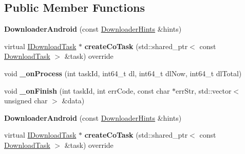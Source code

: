 \subsection*{Public Member Functions}
\begin{DoxyCompactItemize}
\item 
\mbox{\label{classcocos2d_1_1network_1_1DownloaderAndroid_a41411fbb138a35e9967efb3a33dd2e51}} 
{\bfseries Downloader\+Android} (const \hyperlink{classcocos2d_1_1network_1_1DownloaderHints}{Downloader\+Hints} \&hints)
\item 
\mbox{\label{classcocos2d_1_1network_1_1DownloaderAndroid_ac3d969626463383e2816530026a666ae}} 
virtual \hyperlink{classcocos2d_1_1network_1_1IDownloadTask}{I\+Download\+Task} $\ast$ {\bfseries create\+Co\+Task} (std\+::shared\+\_\+ptr$<$ const \hyperlink{classcocos2d_1_1network_1_1DownloadTask}{Download\+Task} $>$ \&task) override
\item 
\mbox{\label{classcocos2d_1_1network_1_1DownloaderAndroid_af201a8862f25a387915ebcfb6e9c19af}} 
void {\bfseries \+\_\+on\+Process} (int task\+Id, int64\+\_\+t dl, int64\+\_\+t dl\+Now, int64\+\_\+t dl\+Total)
\item 
\mbox{\label{classcocos2d_1_1network_1_1DownloaderAndroid_a7f35d9d69f0f615a631e519bed460a51}} 
void {\bfseries \+\_\+on\+Finish} (int task\+Id, int err\+Code, const char $\ast$err\+Str, std\+::vector$<$ unsigned char $>$ \&data)
\item 
\mbox{\label{classcocos2d_1_1network_1_1DownloaderAndroid_a41411fbb138a35e9967efb3a33dd2e51}} 
{\bfseries Downloader\+Android} (const \hyperlink{classcocos2d_1_1network_1_1DownloaderHints}{Downloader\+Hints} \&hints)
\item 
\mbox{\label{classcocos2d_1_1network_1_1DownloaderAndroid_a71d43ad7c0ab6597c1f6112970009e83}} 
virtual \hyperlink{classcocos2d_1_1network_1_1IDownloadTask}{I\+Download\+Task} $\ast$ {\bfseries create\+Co\+Task} (std\+::shared\+\_\+ptr$<$ const \hyperlink{classcocos2d_1_1network_1_1DownloadTask}{Download\+Task} $>$ \&task) override

\end{DoxyCompactItemize}
